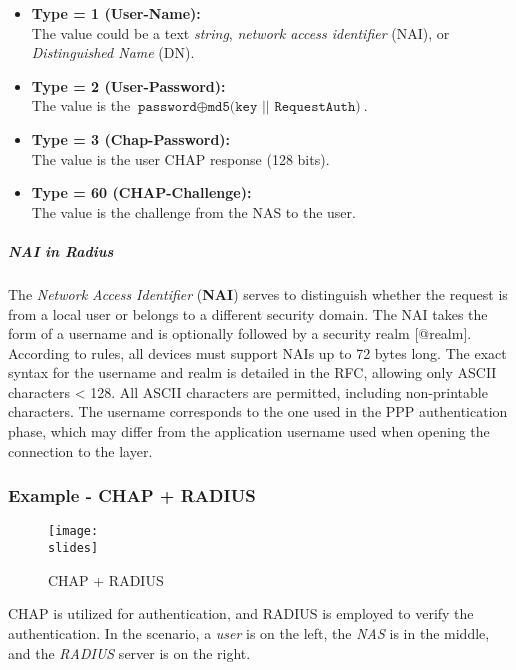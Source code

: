 \begin{itemize}
    \item \textbf{Type = 1 (User-Name):}\\ The value could be a text \textit{string}, \textit{network access identifier} (NAI), or \textit{Distinguished Name} (DN).
    \item \textbf{Type = 2 (User-Password):}\\ 
    The value is the \( \texttt{password} \oplus \texttt{md5(key || RequestAuth)} \).
    \item \textbf{Type = 3 (Chap-Password):}\\
    The value is the user CHAP response (128 bits).
    \item \textbf{Type = 60 (CHAP-Challenge):}\\
    The value is the challenge from the NAS to the user.
\end{itemize}

\subparagraph*{NAI in Radius}
The \textit{Network Access Identifier} (\textbf{NAI}) serves to distinguish whether the request is from a local user or belongs to a different security domain. The NAI takes the form of a username and is optionally followed by a security realm [@realm]. According to rules, all devices must support NAIs up to 72 bytes long. The exact syntax for the username and realm is detailed in the RFC, allowing only ASCII characters < 128. All ASCII characters are permitted, including non-printable characters. The username corresponds to the one used in the PPP authentication phase, which may differ from the application username used when opening the connection to the layer.


\subsubsection{Example - CHAP + RADIUS}
\begin{figure}[h]
    \centering
    \texttt{[image: \\slides]}
    \caption{CHAP + RADIUS}
    \label{fig:chap-radius}
\end{figure}


CHAP is utilized for authentication, and RADIUS is employed to verify the authentication. In the scenario, a \textit{user} is on the left, the \textit{NAS} is in the middle, and the \textit{RADIUS} server is on the right.

